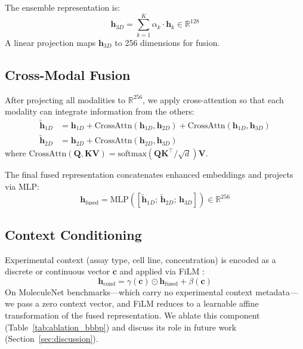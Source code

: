 \documentclass[11pt]{article}
\begin{document}
The ensemble representation is:
\begin{equation}
    \mathbf{h}_{3D} = \sum_{k=1}^{K} \alpha_k \cdot \mathbf{h}_k \in \mathbb{R}^{128}
\end{equation}
A linear projection maps $\mathbf{h}_{3D}$ to 256 dimensions for fusion.

\subsection{Cross-Modal Fusion}

After projecting all modalities to $\mathbb{R}^{256}$, we apply cross-attention so that each modality can integrate information from the others:
\begin{align}
    \tilde{\mathbf{h}}_{1D} &= \mathbf{h}_{1D} + \text{CrossAttn}(\mathbf{h}_{1D}, \mathbf{h}_{2D}) + \text{CrossAttn}(\mathbf{h}_{1D}, \mathbf{h}_{3D}) \\
    \tilde{\mathbf{h}}_{2D} &= \mathbf{h}_{2D} + \text{CrossAttn}(\mathbf{h}_{2D}, \mathbf{h}_{3D})
\end{align}
where $\text{CrossAttn}(\mathbf{Q}, \mathbf{KV}) = \text{softmax}(\mathbf{Q}\mathbf{K}^\top / \sqrt{d})\mathbf{V}$.

The final fused representation concatenates enhanced embeddings and projects via MLP:
\begin{equation}
    \mathbf{h}_{\text{fused}} = \text{MLP}([\tilde{\mathbf{h}}_{1D};\, \tilde{\mathbf{h}}_{2D};\, \mathbf{h}_{3D}]) \in \mathbb{R}^{256}
\end{equation}

\subsection{Context Conditioning}

Experimental context (assay type, cell line, concentration) is encoded as a discrete or continuous vector $\mathbf{c}$ and applied via FiLM \citep{perez2018film}:
\begin{equation}
    \mathbf{h}_{\text{cond}} = \gamma(\mathbf{c}) \odot \mathbf{h}_{\text{fused}} + \beta(\mathbf{c})
\end{equation}
On MoleculeNet benchmarks---which carry no experimental context metadata---we pass a zero context vector, and FiLM reduces to a learnable affine transformation of the fused representation. We ablate this component (Table~\ref{tab:ablation_bbbp}) and discuss its role in future work (Section~\ref{sec:discussion}).
\end{document}
